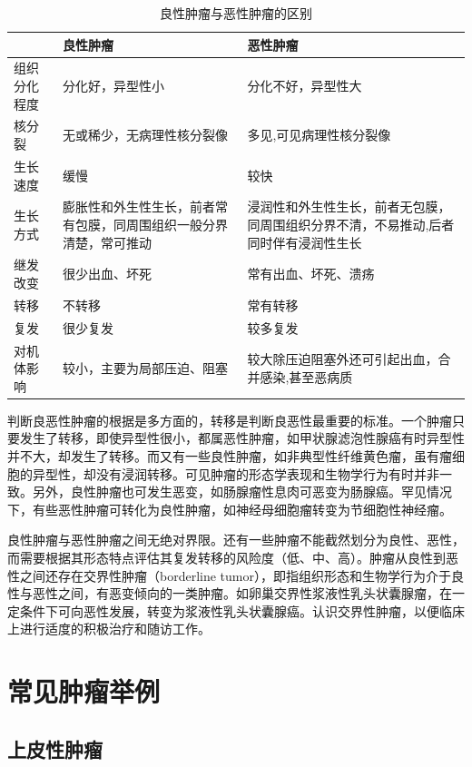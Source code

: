 \begin{table}[ht]
    \caption{良性肿瘤与恶性肿瘤的区别}
    \label{tab5-3}
    \centering
    \begin{tabular}{lp{5cm}p{5cm}}
    \toprule
    & 良性肿瘤&恶性肿瘤\\
    \midrule
    组织分化程度&分化好，异型性小&分化不好，异型性大\\
核分裂&无或稀少，无病理性核分裂像&多见,可见病理性核分裂像\\
生长速度&缓慢&较快\\
生长方式&膨胀性和外生性生长，前者常有包膜，同周围组织一般分界清楚，常可推动&
浸润性和外生性生长，前者无包膜，同周围组织分界不清，不易推动,后者同时伴有浸润性生长\\
继发改变&很少出血、坏死&常有出血、坏死、溃疡\\
转移&不转移&常有转移\\
复发&很少复发&较多复发\\
对机体影响&较小，主要为局部压迫、阻塞&较大除压迫阻塞外还可引起出血，合并感染,甚至恶病质\\
    \bottomrule
    \end{tabular}
  \end{table}

判断良恶性肿瘤的根据是多方面的，转移是判断良恶性最重要的标准。一个肿瘤只要发生了转移，即使异型性很小，都属恶性肿瘤，如甲状腺滤泡性腺癌有时异型性并不大，却发生了转移。而又有一些良性肿瘤，如非典型性纤维黄色瘤，虽有瘤细胞的异型性，却没有浸润转移。可见肿瘤的形态学表现和生物学行为有时并非一致。另外，良性肿瘤也可发生恶变，如肠腺瘤性息肉可恶变为肠腺癌。罕见情况下，有些恶性肿瘤可转化为良性肿瘤，如神经母细胞瘤转变为节细胞性神经瘤。

良性肿瘤与恶性肿瘤之间无绝对界限。还有一些肿瘤不能截然划分为良性、恶性，而需要根据其形态特点评估其复发转移的风险度（低、中、高）。肿瘤从良性到恶性之间还存在交界性肿瘤（borderline
tumor），即指组织形态和生物学行为介于良性与恶性之间，有恶变倾向的一类肿瘤。如卵巢交界性浆液性乳头状囊腺瘤，在一定条件下可向恶性发展，转变为浆液性乳头状囊腺癌。认识交界性肿瘤，以便临床上进行适度的积极治疗和随访工作。

\section{常见肿瘤举例}

\subsection{上皮性肿瘤}

